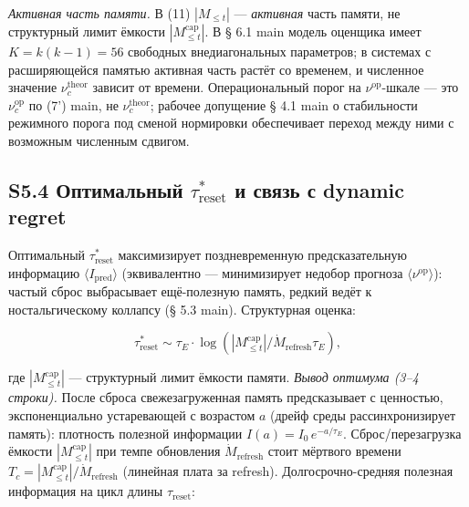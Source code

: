 \documentclass[pdflatex,sn-mathphys-ay]{sn-jnl}
\begin{document}
\emph{Активная часть памяти.} В (11) \(|M_{\le t}|\) --- \emph{активная} часть памяти, не структурный лимит ёмкости \(|M_{\le t}^{\text{cap}}|\). В § 6.1 main модель оценщика имеет \(K = k(k-1) = 56\) свободных внедиагональных параметров; в системах с расширяющейся памятью активная часть растёт со временем, и численное значение \(\nu_c^{\text{theor}}\) зависит от времени. Операциональный порог на \(\nu^{\text{op}}\)-шкале --- это \(\nu_c^{\text{op}}\) по (7') main, не \(\nu_c^{\text{theor}}\); рабочее допущение § 4.1 main о стабильности режимного порога под сменой нормировки обеспечивает переход между ними с возможным численным сдвигом.



\subsection*{\texorpdfstring{S5.4 Оптимальный \(\tau_{\text{reset}}^*\) и связь с dynamic regret}{S5.4 Оптимальный \textbackslash tau\_\{\textbackslash text\{reset\}\}\^{}* и связь с dynamic regret}}\label{s5.4-ux43eux43fux442ux438ux43cux430ux43bux44cux43dux44bux439-tau_textreset-ux438-ux441ux432ux44fux437ux44c-ux441-dynamic-regret}



Оптимальный \(\tau_{\text{reset}}^*\) максимизирует поздневременную предсказательную информацию \(\langle I_{\text{pred}}\rangle\) (эквивалентно --- минимизирует недобор прогноза \(\langle\nu^{\text{op}}\rangle\)): частый сброс выбрасывает ещё-полезную память, редкий ведёт к ностальгическому коллапсу (§ 5.3 main). Структурная оценка:



\[\tau_{\text{reset}}^* \sim \tau_E \cdot \log(|M_{\le t}^{\text{cap}}|/\dot{M}_{\text{refresh}} \tau_E),\]



где \(|M_{\le t}^{\text{cap}}|\) --- структурный лимит ёмкости памяти. \emph{Вывод оптимума (3--4 строки).} После сброса свежезагруженная память предсказывает с ценностью, экспоненциально устаревающей с возрастом \(a\) (дрейф среды рассинхронизирует память): плотность полезной информации \(I(a) = I_0\,e^{-a/\tau_E}\). Сброс/перезагрузка ёмкости \(|M_{\le t}^{\text{cap}}|\) при темпе обновления \(\dot M_{\text{refresh}}\) стоит мёртвого времени \(T_c = |M_{\le t}^{\text{cap}}|/\dot M_{\text{refresh}}\) (линейная плата за refresh). Долгосрочно-средняя полезная информация на цикл длины \(\tau_{\text{reset}}\):
\end{document}
